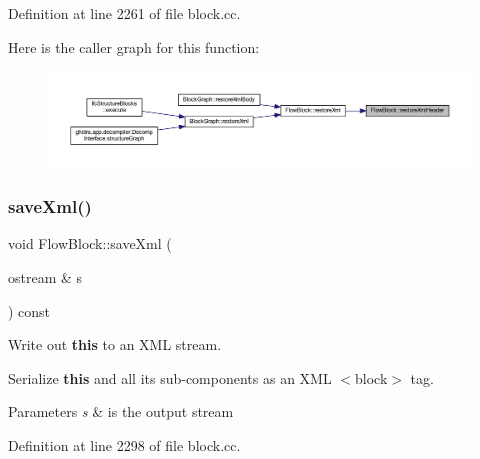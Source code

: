 Definition at line 2261 of file block.\+cc.

Here is the caller graph for this function\+:
\nopagebreak
\begin{figure}[H]
\begin{center}
\leavevmode
\includegraphics[width=350pt]{class_flow_block_ad41a9b871ab1994b91334de10fc2c63f_icgraph}
\end{center}
\end{figure}
\mbox{\label{class_flow_block_a91d4573992c7a798259b34be67d97d5a}} 
\subsubsection{\texorpdfstring{saveXml()}{saveXml()}}
{\footnotesize\ttfamily void Flow\+Block\+::save\+Xml (\begin{DoxyParamCaption}\item[{ostream \&}]{s }\end{DoxyParamCaption}) const}



Write out {\bfseries{this}} to an X\+ML stream. 

Serialize {\bfseries{this}} and all its sub-\/components as an X\+ML $<$block$>$ tag. 
\begin{DoxyParams}{Parameters}
{\em s} & is the output stream \\
\hline
\end{DoxyParams}


Definition at line 2298 of file block.\+cc.

